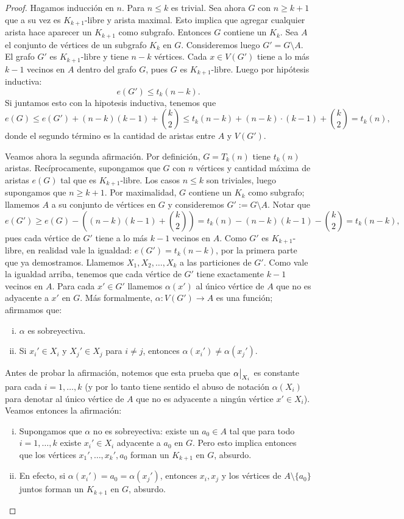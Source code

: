 \documentclass[12pt]{report}
\theoremstyle{plain}
\theoremstyle{definition}
\newcommand\rest[2]{{%
  \left.\kern-\nulldelimiterspace %
  #1 %
  \vphantom{\big|} %
  \right|_{#2} %
  }}
\begin{document}
\begin{proof}
Hagamos inducción en $n$. Para $n \leq k$ es trivial. Sea ahora $G$ con $n \geq k+1$ que a su vez es $K_{k+1}$-libre y arista maximal. Esto implica que agregar cualquier arista hace aparecer un $K_{k+1}$ como subgrafo. Entonces $G$ contiene un $K_{k}$. Sea $A$ el conjunto de vértices de un subgrafo $K_{k}$ en $G$. Consideremos luego $G' = G\setminus A$. El grafo $G'$ es $K_{k+1}$-libre y tiene $n-k$ vértices. Cada $x \in V(G')$ tiene a lo más $k-1$ vecinos en $A$ dentro del grafo $G$, pues $G$ es $K_{k+1}$-libre. Luego por hipótesis inductiva:
\[
    e(G') \leq t_k(n-k).
\]
Si juntamos esto con la hipotesis inductiva, tenemos que
\[
    e(G) \leq e(G') + (n-k) (k-1) + \binom {k} 2    \leq t_k (n-k) + (n-k) \cdot (k-1) + \binom {k} 2 = t_k (n),
\]
donde el segundo término es la cantidad de aristas entre $A$ y $V(G')$.

Veamos ahora la segunda afirmación. Por definición, $G = T_k (n)$ tiene $t_k (n)$ aristas. Recíprocamente, supongamos que $G$ con $n$ vértices y cantidad máxima de aristas $e(G)$ tal que es $K_{k+1}$-libre. Los casos $n \leq k$ son triviales, luego supongamos que $n \geq k+1$. Por maximalidad, $G$ contiene un $K_{k}$ como subgrafo; llamemos $A$ a su conjunto de vértices en $G$ y consideremos $G' := G \setminus A$. Notar que
\[
    e(G') \geq e(G)- \left ( (n-k) (k-1) + \binom {k} 2 \right ) = t_k (n) -(n-k) (k-1) - \binom{k} 2 = t_k(n-k),
\]
pues cada vértice de $G'$ tiene a lo más $k-1$ vecinos en $A$. Como $G'$ es $K_{k+1}$-libre, en realidad vale la igualdad: $e(G') = t_k (n-k)$, por la primera parte que ya demostramos. Llamemos $X_1, X_2, \ldots, X_k$ a las particiones de $G'$. Como vale la igualdad arriba, tenemos que cada vértice de $G'$ tiene exactamente $k-1$ vecinos en $A$. Para cada $x' \in G'$ llamemos $\alpha(x')$ al único vértice de $A$ que no es adyacente a $x'$ en $G$. Más formalmente, $\alpha : V(G') \rightarrow A$ es una función; afirmamos que:
\begin{enumerate}[(i)]
\item $\alpha$ es sobreyectiva.
\item Si $x_i ' \in X_i$ y $X_j ' \in X_j$ para $i \neq j$, entonces $\alpha (x_i') \neq \alpha (x_j')$.
\end{enumerate}
Antes de probar la afirmación, notemos que esta prueba que
$\rest{\alpha}{X_i}$ es constante para cada $i = 1, \ldots, k$ (y por lo tanto tiene sentido el abuso de notación $\alpha (X_i)$ para denotar al único vértice de $A$ que no es adyacente a ningún vértice $x' \in X_i$). Veamos entonces la afirmación:
\begin{enumerate}[(i)]
\item Supongamos que $\alpha$ no es sobreyectiva: existe un $a_0 \in A$ tal que para todo $i = 1, \ldots, k$ existe $x_i ' \in X_i$ adyacente a $a_0$ en $G$. Pero esto implica entonces que los vértices $x_1' , \ldots, x_k ', a_0$ forman un $K_{k+1}$ en $G$, absurdo.
\item En efecto, si $\alpha (x_i ') = a_0 = \alpha (x_j ')$, entonces $x_i, x_j$ y los vértices de $A \setminus \{a_0\}$ juntos forman un $K_{k+1}$ en $G$, absurdo.
\end{enumerate}


\end{proof}
\end{document}

